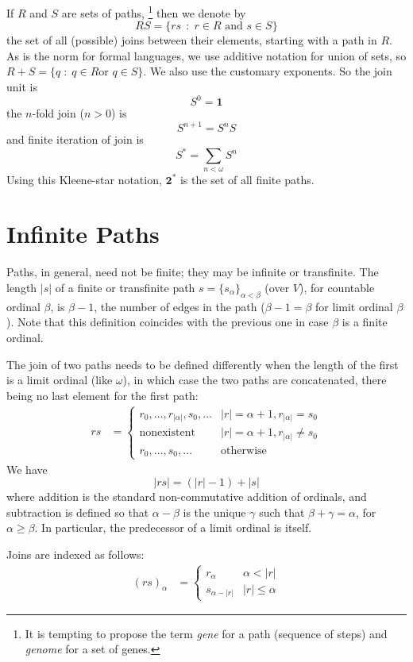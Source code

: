 \documentclass{llncs}
\newcommand{\ABC}{V}
\newcommand{\Pair}{\textbf{2}}
\newcommand{\One}{\textbf{1}}
\begin{document}
If $R$ and $S$ are sets of paths,%
\footnote{It is tempting to propose the term \emph{gene} for a path
  (sequence of steps) and \emph{genome} for a set of genes.} 
 then we denote by
\[
RS = \{{rs}\,\;\colon\; r\in R \textrm{ and } s\in S\}
\]
the set of all (possible) joins between their elements, starting with
a path in $R$.  As is the norm for formal languages, we use additive
notation for union of sets, so $R+S = \{ q \;\colon\; q\in R \textrm{
  or } q \in S\}$.  We also use the customary exponents. So the join
unit is
\[
S^0 = \One
\]
the $n$-fold join ($n>0$) is
\[
S^{n+1} = S^{n} S
\]
and  finite iteration of join is
\[
S^\ast = \sum_{n<\omega} S^n
\]
Using this Kleene-star notation, $\Pair^\ast$ is the set of all finite paths.

\section{Infinite Paths}

Paths, in general, need not be finite; they may be infinite or
transfinite.  The length $|s|$ of a finite or transfinite path
$s=\{s_\alpha\}_{\alpha< \beta}$ (over $\ABC$), for countable ordinal
$\beta$, is $\beta-1$, the number of edges in the path
($\beta-1=\beta$ for limit ordinal $\beta$). Note that this definition
coincides with the previous one in case $\beta$ is a finite ordinal.

The join of two paths needs to be defined differently
when the length of the first is a limit ordinal (like $\omega$), in
which case the two paths are concatenated, there being no last element for the first path:
\[
\begin{array}{ll}
r s & =\begin{cases}
r_0 ,\dots, r_{|\alpha|}, s_0, \dots & |r|=\alpha+1, r_{|\alpha|}=s_0\\
\mbox{nonexistent}& |r|=\alpha+1, r_{|\alpha|} \neq s_0\\
r_0, \dots , s_0, \dots  & \mbox{otherwise}
\end{cases}
\end{array}
\]
We have
\[
|rs| = (|r|-1)  + |s|
\]
where addition is the standard non-commutative addition of ordinals,
and subtraction is defined so that $\alpha - \beta$ is the unique $\gamma$ such
that $\beta+\gamma=\alpha$, for $\alpha\geq\beta$. In particular, the
predecessor of a limit ordinal is itself.

Joins are indexed as follows:
\[
\begin{array}{ll}
(rs)_\alpha & =\begin{cases}
r_\alpha & \alpha < |r|\\
s_{\alpha -  |r|} &  |r| \leq \alpha
\end{cases} 
\end{array}
\]
\end{document}
